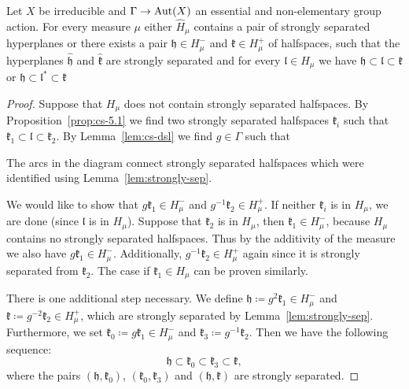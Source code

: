 \begin{lemma}[{\cite[Lemma~4.19]{MR3509968}}]
  \label{lem:4.19}
  Let \(X\) be irreducible and \(\Gamma \to \operatorname{Aut}(X)\) an essential and non-elementary group action. For every measure \(\mu\) either \(\hat H_\mu\) contains a pair of strongly separated hyperplanes or there exists a pair \(\mathfrak{h} \in H_\mu^-\) and \(\mathfrak{k} \in H_\mu^+\) of halfspaces, such that the hyperplanes \(\mathfrak{\hat h}\) and \(\mathfrak{\hat k}\) are strongly separated and for every \(\mathfrak{l} \in H_\mu\) we have  \(\mathfrak{h} \subset \mathfrak{l} \subset  \mathfrak{k}\) or \(\mathfrak{h} \subset \mathfrak{l}^\ast \subset \mathfrak{k}\)
\end{lemma}

\begin{proof}
  Suppose that \(H_\mu\) does not contain strongly separated halfspaces. By Proposition\ \ref{prop:cs-5.1} we find two strongly separated halfspaces \(\mathfrak{k}_i\) such that \(\mathfrak{k}_1 \subset \mathfrak{l} \subset \mathfrak{k}_2\). By Lemma~\ref{lem:cs-dsl} we find \(g \in \Gamma\) such that
  \begin{center}
    
  \end{center}
  The arcs in the diagram connect strongly separated halfspaces which were identified using Lemma~\ref{lem:strongly-sep}.

  We would like to show that \(g\mathfrak{k}_1 \in H_\mu^-\) and \(g^{-1}\mathfrak{k}_2 \in H_\mu^+\). If neither \(\mathfrak{k}_i\) is in \(H_\mu\), we are done (since \(\mathfrak{l}\) is in \(H_\mu\)). Suppose that \(\mathfrak{k}_2\) is in \(H_\mu\), then \(\mathfrak{k}_1 \in H_\mu^-\), because \(H_\mu\) contains no strongly separated halfspaces. Thus by the additivity of the measure we also have \(g\mathfrak{k}_1 \in H_\mu^-\). Additionally, \(g^{-1}\mathfrak{k}_2 \in H_\mu^+\) again since it is strongly separated from \(\mathfrak{k}_2\). The case if \(\mathfrak{k}_1 \in H_\mu\) can be proven similarly.

  There is one additional step necessary. We define \(\mathfrak{h} \coloneqq g^2\mathfrak{k}_1 \in H_\mu^-\) and \(\mathfrak{k} \coloneqq g^{-2}\mathfrak{k}_2 \in H_\mu^+\), which are strongly separated by Lemma~\ref{lem:strongly-sep}. Furthermore, we set \(\mathfrak{k_0} \coloneqq g\mathfrak{k}_1 \in H_\mu^-\) and \(\mathfrak{k}_3 \coloneqq g^{-1}\mathfrak{k}_2\). Then we have the following sequence:
  \[
    \mathfrak{h} \subset \mathfrak{k}_0 \subset \mathfrak{k}_3 \subset \mathfrak{k},
  \]
  where the pairs \((\mathfrak{h}, \mathfrak{k}_0)\), \((\mathfrak{k_0}, \mathfrak{k}_3)\) and \((\mathfrak{h}, \mathfrak{k})\) are strongly separated. 


\end{proof}
